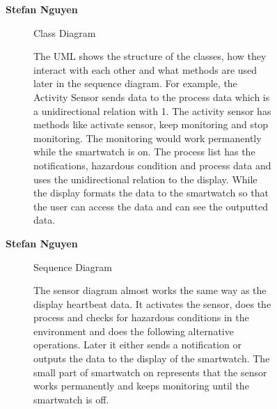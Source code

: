 \documentclass{article}
\begin{document}
	\begin{figure}[htbp]
		\textbf{Stefan Nguyen}
		\centering
		\begin{subfigure}{\textwidth}
			\resizebox{\textwidth}{!}{}
			\caption{Class Diagram}
		\end{subfigure}
		\begin{subfigure}{\textwidth}
			The UML shows the structure of the classes, how they interact with each other and what methods are 
			used later in the sequence diagram. For example, the Activity Sensor sends data to the process data 
			which is a unidirectional relation with 1. The activity sensor has methods like activate sensor, keep 
			monitoring and stop monitoring. The monitoring would work permanently while the smartwatch is on. The 
			process list has the notifications, hazardous condition and process data and uses the unidirectional 
			relation to the display. While the display formats the data to the smartwatch so that the user can access 
			the data and can see the outputted data. 
		\end{subfigure}
	\end{figure}
	

	\begin{figure}[htbp]
		\textbf{Stefan Nguyen}
		\centering
		\begin{subfigure}{\textwidth}
			\resizebox{\textwidth}{!}{}
			\caption{Sequence Diagram}
		\end{subfigure}
		\begin{subfigure}{\textwidth}
			The sensor diagram almost works the same way as the display heartbeat data. It activates the sensor, 
			does the process and checks for hazardous conditions in the environment and does the following alternative
			operations. Later it either sends a notification or outputs the data to the display of the smartwatch. 
			The small part of smartwatch on represents that the sensor works permanently and keeps monitoring until 
			the smartwatch is off. 
		\end{subfigure}
	\end{figure}
	\newpage
\end{document}

